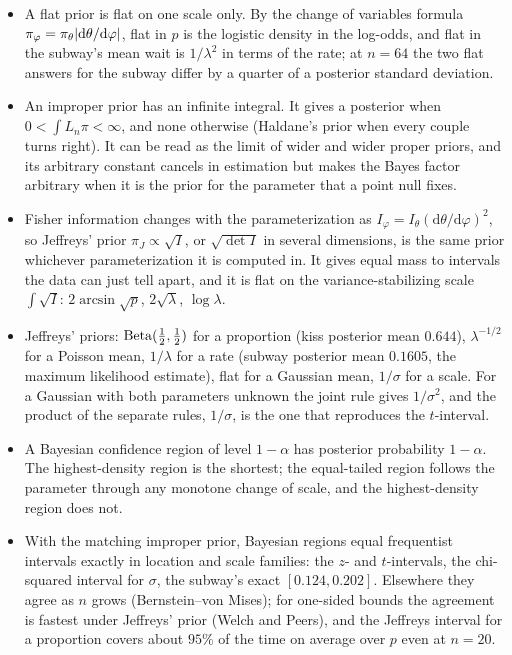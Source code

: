\begin{itemize}[nosep]
\item A flat prior is flat on one scale only. By the change of variables formula $\pi_\varphi = \pi_\theta\lvert\mathrm{d}\theta/\mathrm{d}\varphi\rvert$, flat in $p$ is the logistic density in the log-odds, and flat in the subway's mean wait is $1/\lambda^2$ in terms of the rate; at $n = 64$ the two flat answers for the subway differ by a quarter of a posterior standard deviation.
\item An improper prior has an infinite integral. It gives a posterior when $0 < \int L_n\pi < \infty$, and none otherwise (Haldane's prior when every couple turns right). It can be read as the limit of wider and wider proper priors, and its arbitrary constant cancels in estimation but makes the Bayes factor arbitrary when it is the prior for the parameter that a point null fixes.
\item Fisher information changes with the parameterization as $I_\varphi = I_\theta(\mathrm{d}\theta/\mathrm{d}\varphi)^2$, so Jeffreys' prior $\pi_J \propto \sqrt{I}$, or $\sqrt{\det I}$ in several dimensions, is the same prior whichever parameterization it is computed in. It gives equal mass to intervals the data can just tell apart, and it is flat on the variance-stabilizing scale $\int\sqrt{I}$: $2\arcsin\sqrt{p}$, $2\sqrt{\lambda}$, $\log\lambda$.
\item Jeffreys' priors: $\mathrm{Beta}(\frac12, \frac12)$ for a proportion (kiss posterior mean $0.644$), $\lambda^{-1/2}$ for a Poisson mean, $1/\lambda$ for a rate (subway posterior mean $0.1605$, the maximum likelihood estimate), flat for a Gaussian mean, $1/\sigma$ for a scale. For a Gaussian with both parameters unknown the joint rule gives $1/\sigma^2$, and the product of the separate rules, $1/\sigma$, is the one that reproduces the $t$-interval.
\item A Bayesian confidence region of level $1 - \alpha$ has posterior probability $1 - \alpha$. The highest-density region is the shortest; the equal-tailed region follows the parameter through any monotone change of scale, and the highest-density region does not.
\item With the matching improper prior, Bayesian regions equal frequentist intervals exactly in location and scale families: the $z$- and $t$-intervals, the chi-squared interval for $\sigma$, the subway's exact $[0.124, 0.202]$. Elsewhere they agree as $n$ grows (Bernstein--von Mises); for one-sided bounds the agreement is fastest under Jeffreys' prior (Welch and Peers), and the Jeffreys interval for a proportion covers about $95\%$ of the time on average over $p$ even at $n = 20$.
\end{itemize}

